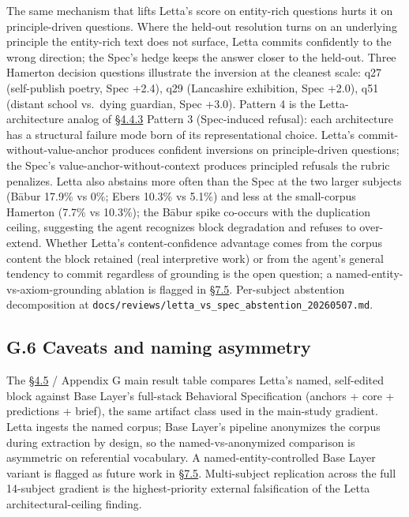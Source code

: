 The same mechanism that lifts Letta's score on entity-rich questions
hurts it on principle-driven questions. Where the held-out resolution
turns on an underlying principle the entity-rich text does not surface,
Letta commits confidently to the wrong direction; the Spec's hedge keeps
the answer closer to the held-out. Three Hamerton decision questions
illustrate the inversion at the cleanest scale: q27 (self-publish
poetry, Spec +2.4), q29 (Lancashire exhibition, Spec +2.0), q51 (distant
school vs.~dying guardian, Spec +3.0). Pattern 4 is the
Letta-architecture analog of \hyperref[where-the-spec-helps-where-it-hurts-and-which-question-types-route-to-each]{§4.4.3} Pattern 3 (Spec-induced refusal):
each architecture has a structural failure mode born of its
representational choice. Letta's commit-without-value-anchor produces
confident inversions on principle-driven questions; the Spec's
value-anchor-without-context produces principled refusals the rubric
penalizes. Letta also abstains more often than the Spec at the two
larger subjects (Bābur 17.9\% vs 0\%; Ebers 10.3\% vs 5.1\%) and less at
the small-corpus Hamerton (7.7\% vs 10.3\%); the Bābur spike co-occurs
with the duplication ceiling, suggesting the agent recognizes block
degradation and refuses to over-extend. Whether Letta's
content-confidence advantage comes from the corpus content the block
retained (real interpretive work) or from the agent's general tendency
to commit regardless of grounding is the open question; a
named-entity-vs-axiom-grounding ablation is flagged in \hyperref[stateful-agent-implementations-and-temporal-drift-tracking]{§7.5}. Per-subject
abstention decomposition at
\texttt{docs/reviews/letta\_vs\_spec\_abstention\_20260507.md}.

\hypertarget{g.6-caveats-and-naming-asymmetry}{%
\subsection{G.6 Caveats and naming
asymmetry}\label{g.6-caveats-and-naming-asymmetry}}

The \hyperref[exploratory-case-study-letta-stateful-agent-n3-post-hoc]{§4.5} / Appendix G main result table compares Letta's named,
self-edited block against Base Layer's full-stack Behavioral
Specification (anchors + core + predictions + brief), the same artifact
class used in the main-study gradient. Letta ingests the named corpus;
Base Layer's pipeline anonymizes the corpus during extraction by design,
so the named-vs-anonymized comparison is asymmetric on referential
vocabulary. A named-entity-controlled Base Layer variant is flagged as
future work in \hyperref[stateful-agent-implementations-and-temporal-drift-tracking]{§7.5}. Multi-subject replication across the full
14-subject gradient is the highest-priority external falsification of
the Letta architectural-ceiling finding.

